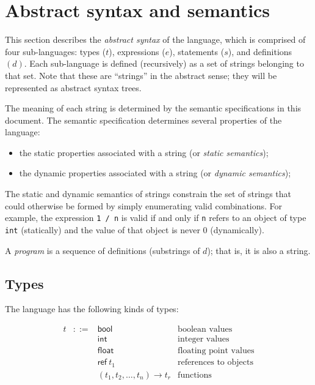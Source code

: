 \documentclass[11pt]{article}
\makeatletter
\newcommand{\code}[1]{\lstinline @#1@}
\newcommand{\mathsc}[1]{\bm{\mathsf{#1}}}
\newcommand{\typebool}{\ensuremath{\mathsc{bool}}\xspace}
\newcommand{\typeint}{\ensuremath{\mathsc{int}}\xspace}
\newcommand{\typefloat}{\ensuremath{\mathsc{float}}\xspace}
\newcommand{\typeref}[1]{\ensuremath{\mathsc{ref}~#1}\xspace}
\newcommand{\typefn}[2]{\ensuremath{(#1)\rightarrow #2}\xspace}
\makeatother
\begin{document}
\section{Abstract syntax and semantics}

This section describes the \emph{abstract syntax} of the language, which is comprised of four sub-languages: types ($t$), expressions ($e$), statements ($s$), and definitions $(d)$.
Each sub-language is defined (recursively) as a set of strings belonging to that set.
Note that these are ``strings'' in the abstract sense; they will be represented as abstract syntax trees.

The meaning of each string is determined by the semantic specifications in this document. 
The semantic specification determines several properties of the language:
\begin{itemize}
\item the static properties associated with a string (or \emph{static semantics});
\item the dynamic properties associated with a string (or \emph{dynamic semantics});
\end{itemize}
The static and dynamic semantics of strings constrain the set of strings that could otherwise be formed by simply enumerating valid combinations.
For example, the expression \code{1 / n} is valid if and only if \code{n} refers to an object of type \code{int} (statically) and the value of that object is never 0 (dynamically).

A \emph{program} is a sequence of definitions (substrings of $d$); that is,
it is also a string.

\subsection{Types}

The language has the following kinds of types:

\[
\begin{array}{lcll}
t &::=& \typebool  & \text{boolean values} \\
  &   & \typeint   & \text{integer values} \\
  &   & \typefloat & \text{floating point values} \\
  &   & \typeref{t_1}   & \text{references to objects} \\
  &   & \typefn{t_1, t_2, \ldots, t_n}{t_r}
                  & \text{functions}
\end{array}
\]

\end{document}
